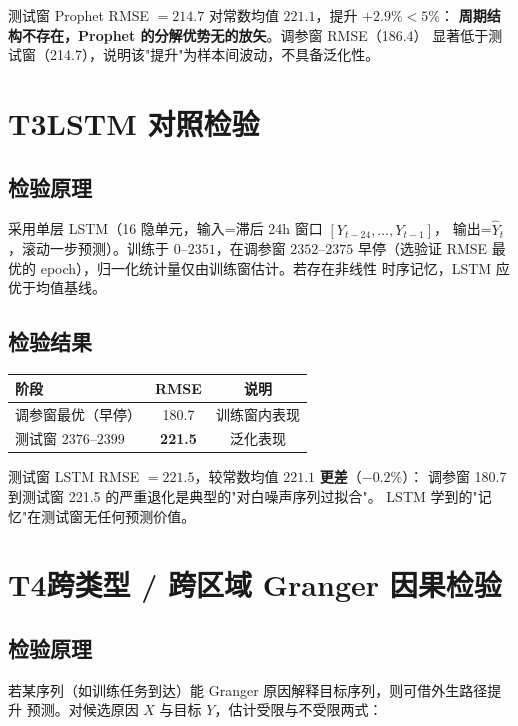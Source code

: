 \documentclass{internal-report}
\begin{document}
测试窗 Prophet RMSE $=214.7$ 对常数均值 $221.1$，提升 $+2.9\% < 5\%$：
\textbf{周期结构不存在，Prophet 的分解优势无的放矢}。调参窗 RMSE（186.4）
显著低于测试窗（214.7），说明该"提升"为样本间波动，不具备泛化性。

\section{T3\quad LSTM 对照检验}

\subsection{检验原理}

采用单层 LSTM（16 隐单元，输入=滞后 24h 窗口 $[Y_{t-24},\ldots,Y_{t-1}]$，
输出=$\hat{Y}_t$，滚动一步预测）。训练于 $0$--$2351$，在调参窗 $2352$--$2375$
早停（选验证 RMSE 最优的 epoch），归一化统计量仅由训练窗估计。若存在非线性
时序记忆，LSTM 应优于均值基线。

\subsection{检验结果}

\begin{center}
\begin{tabular}{lcc}
\toprule
阶段 & RMSE & 说明 \\
\midrule
调参窗最优（早停） & 180.7 & 训练窗内表现 \\
测试窗 $2376$--$2399$ & \textbf{221.5} & 泛化表现 \\
\bottomrule
\end{tabular}
\end{center}

测试窗 LSTM RMSE $=221.5$，较常数均值 $221.1$ \textbf{更差}（$-0.2\%$）：
调参窗 180.7 到测试窗 221.5 的严重退化是典型的"对白噪声序列过拟合"。
LSTM 学到的"记忆"在测试窗无任何预测价值。

\section{T4\quad 跨类型 / 跨区域 Granger 因果检验}

\subsection{检验原理}

若某序列（如训练任务到达）能 Granger 原因解释目标序列，则可借外生路径提升
预测。对候选原因 $X$ 与目标 $Y$，估计受限与不受限两式：
\end{document}
